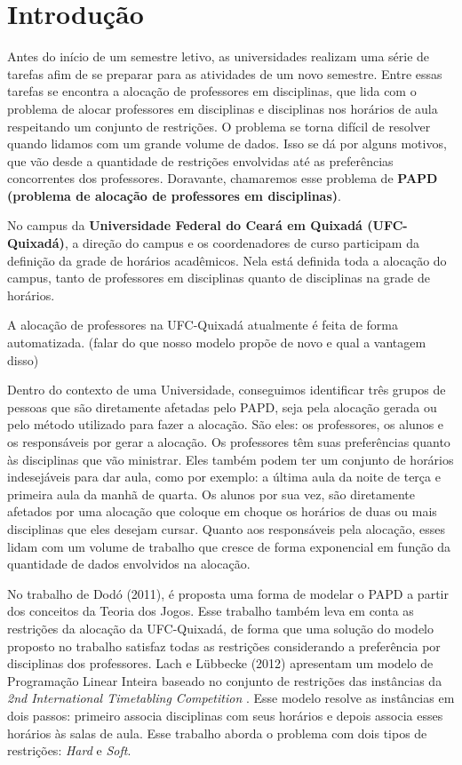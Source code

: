 
\chapter{Introdução}

Antes do início de um semestre letivo, as universidades realizam uma série de tarefas afim de se preparar para as atividades de um novo semestre. Entre essas tarefas se encontra a alocação de professores em disciplinas, que lida com o problema de alocar professores em disciplinas e disciplinas nos horários de aula respeitando um conjunto de restrições. O problema se torna difícil de resolver quando lidamos com um grande volume de dados. Isso se dá por alguns motivos, que vão desde a quantidade de restrições envolvidas até as preferências concorrentes dos professores. Doravante, chamaremos esse problema de \textbf{PAPD (problema de alocação de professores em disciplinas)}.

No campus da \textbf{Universidade Federal do Ceará em Quixadá (UFC-Quixadá)}, a direção do campus e os coordenadores de curso participam da definição da grade de horários acadêmicos. Nela está definida toda a alocação do campus, tanto de professores em disciplinas quanto de disciplinas na grade de horários.

A alocação de professores na UFC-Quixadá atualmente é feita de forma automatizada. (falar do que nosso modelo propõe de novo e qual a vantagem disso)

Dentro do contexto de uma Universidade, conseguimos identificar três grupos de pessoas que são diretamente afetadas pelo PAPD, seja pela alocação gerada ou pelo método utilizado para fazer a alocação. São eles: os professores, os alunos e os responsáveis por gerar a alocação. Os professores têm suas preferências quanto às disciplinas que vão ministrar. Eles também podem ter um conjunto de horários indesejáveis para dar aula, como por exemplo: a última aula da noite de terça e primeira aula da manhã de quarta. Os alunos por sua vez, são diretamente afetados por uma alocação que coloque em choque os horários de duas ou mais disciplinas que eles desejam cursar. Quanto aos responsáveis pela alocação, esses lidam com um volume de trabalho que cresce de forma exponencial em função da quantidade de dados envolvidos na alocação. 

No trabalho de Dodó (2011), é proposta uma forma de modelar o PAPD a partir dos conceitos da Teoria dos Jogos. Esse trabalho também leva em conta as restrições da alocação da UFC-Quixadá, de forma que uma solução do modelo proposto no trabalho satisfaz todas as restrições considerando a preferência por disciplinas dos professores. Lach e Lübbecke (2012) apresentam um modelo de Programação Linear Inteira baseado no conjunto de restrições das instâncias da \textit{2nd International Timetabling Competition} \cite{itc}. Esse modelo resolve as instâncias em dois passos: primeiro  associa disciplinas com seus horários e depois associa esses horários às salas de aula. Esse trabalho aborda o problema com dois tipos de restrições: \textit{Hard} e \textit{Soft}.

